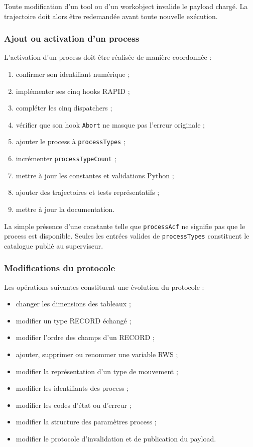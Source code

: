 \documentclass{rapportENSAM}
\begin{document}
Toute modification d'un tool ou d'un workobject invalide le payload chargé.
La trajectoire doit alors être redemandée avant toute nouvelle exécution.


\subsubsection{Ajout ou activation d'un process}
\label{subsubsec:rapid-process-changes}

L'activation d'un process doit être réalisée de manière coordonnée :

\begin{enumerate}
    \item confirmer son identifiant numérique ;
    \item implémenter ses cinq hooks RAPID ;
    \item compléter les cinq dispatchers ;
    \item vérifier que son hook \texttt{Abort} ne masque pas l'erreur
    originale ;
    \item ajouter le process à \texttt{processTypes} ;
    \item incrémenter \texttt{processTypeCount} ;
    \item mettre à jour les constantes et validations Python ;
    \item ajouter des trajectoires et tests représentatifs ;
    \item mettre à jour la documentation.
\end{enumerate}

La simple présence d'une constante telle que \texttt{processAcf} ne signifie
pas que le process est disponible. Seules les entrées valides de
\texttt{processTypes} constituent le catalogue publié au superviseur.


\subsubsection{Modifications du protocole}
\label{subsubsec:rapid-protocol-changes}

Les opérations suivantes constituent une évolution du protocole :

\begin{itemize}
    \item changer les dimensions des tableaux ;
    \item modifier un type RECORD échangé ;
    \item modifier l'ordre des champs d'un RECORD ;
    \item ajouter, supprimer ou renommer une variable RWS ;
    \item modifier la représentation d'un type de mouvement ;
    \item modifier les identifiants des process ;
    \item modifier les codes d'état ou d'erreur ;
    \item modifier la structure des paramètres process ;
    \item modifier le protocole d'invalidation et de publication du payload.
\end{itemize}
\end{document}

